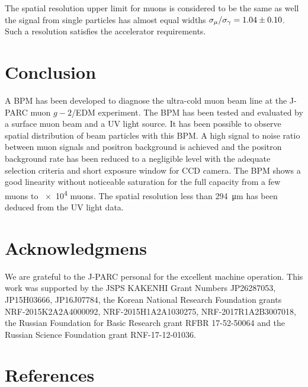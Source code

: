 \documentclass[preprint,3p,twocolumn]{elsarticle}
\begin{document}
The spatial resolution upper limit for muons is considered to be the same as well the signal from single particles has almost equal widths
$\sigma_{\mu} / \sigma_{\gamma} = \num{1.04 \pm 0.10}$.
Such a resolution satisfies the accelerator requirements.


\section{Conclusion}

A BPM has been developed to diagnose the ultra-cold muon beam line at the J-PARC muon $g-2$/EDM experiment. The BPM has been tested and evaluated by a surface muon beam and a UV light source.
It has been possible to observe spatial distribution of beam particles with this BPM.
A high signal to noise ratio between muon signals and positron background is achieved and the positron background rate has been reduced to a negligible level with the adequate selection criteria and short exposure window for CCD camera.
The BPM shows a good linearity without noticeable saturation for the full capacity from a few muons to \num{e4} muons. The spatial resolution less than \SI{294}{\micro\metre} has been deduced from the UV light data.


\section*{Acknowledgmens}

We are grateful to the J-PARC personal for the excellent machine operation.
This work was supported by 
the JSPS KAKENHI Grant Numbers JP26287053, JP15H03666, JP16J07784,
the Korean National Research Foundation grants NRF-2015K2A2A4000092, NRF-2015H1A2A1030275, NRF-2017R1A2B3007018,
the Russian Foundation for Basic Research grant RFBR 17-52-50064 and
the Russian Science Foundation grant RNF-17-12-01036. 

\section*{References}


\end{document}
